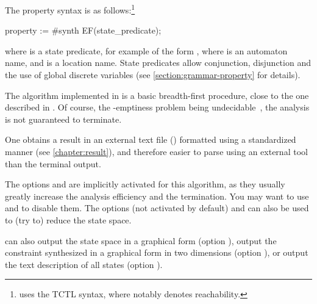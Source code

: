 The property syntax is as follows:\footnote{%
	\imitator{} uses the TCTL syntax, where  notably denotes reachability.
}

\begin{IMITATORproperty}
property := #synth EF(state_predicate);
\end{IMITATORproperty}


\noindent{}where  is a state predicate, for example of the form , where  is an automaton name, and  is a location name.
State predicates allow conjunction, disjunction and the use of global discrete variables (see \cref{section:grammar-property} for details).



The algorithm \EFsynth{} implemented in \imitator{} is a basic breadth-first procedure, close to the one described in \cite{JLR15}.
Of course, the -emptiness problem being undecidable~\cite{AHV93}, the analysis is not guaranteed to terminate.

One obtains a result in an external text file () formatted using a standardized manner (see \cref{chapter:result}), and therefore easier to parse using an external tool than the terminal output.

The options  \cite{AFS13atva} and  are implicitly activated for this algorithm, as they usually greatly increase the analysis efficiency and the termination.
You may want to use  and  to disable them.
The options  (not activated by default) and  can also be used to (try to) reduce the state space.

\imitator{} can also
output the state space in a graphical form (option ),
output the constraint synthesized in a graphical form in two dimensions (option ),
or
output the text description of all states (option ).


